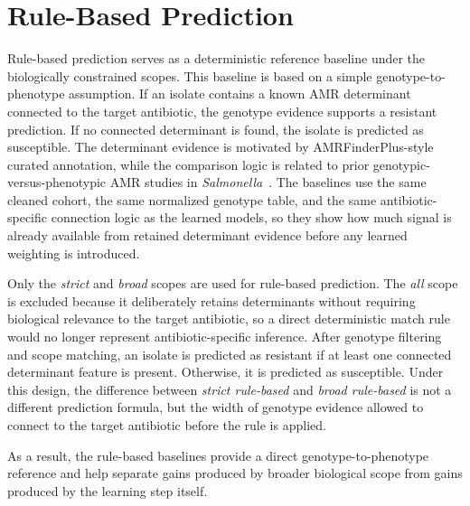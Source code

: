 \section{Rule-Based Prediction}

Rule-based prediction serves as a deterministic reference baseline under the biologically constrained scopes. This baseline is based on a simple genotype-to-phenotype assumption. If an isolate contains a known AMR determinant connected to the target antibiotic, the genotype evidence supports a resistant prediction. If no connected determinant is found, the isolate is predicted as susceptible. The determinant evidence is motivated by AMRFinderPlus-style curated annotation, while the comparison logic is related to prior genotypic-versus-phenotypic AMR studies in \textit{Salmonella}~\citep{feldgarden2021amrfinderplus,shen2024comparison}. The baselines use the same cleaned cohort, the same normalized genotype table, and the same antibiotic-specific connection logic as the learned models, so they show how much signal is already available from retained determinant evidence before any learned weighting is introduced.

Only the \textit{strict} and \textit{broad} scopes are used for rule-based prediction. The \textit{all} scope is excluded because it deliberately retains determinants without requiring biological relevance to the target antibiotic, so a direct deterministic match rule would no longer represent antibiotic-specific inference. After genotype filtering and scope matching, an isolate is predicted as resistant if at least one connected determinant feature is present. Otherwise, it is predicted as susceptible. Under this design, the difference between \textit{strict rule-based} and \textit{broad rule-based} is not a different prediction formula, but the width of genotype evidence allowed to connect to the target antibiotic before the rule is applied.

As a result, the rule-based baselines provide a direct genotype-to-phenotype reference and help separate gains produced by broader biological scope from gains produced by the learning step itself.

